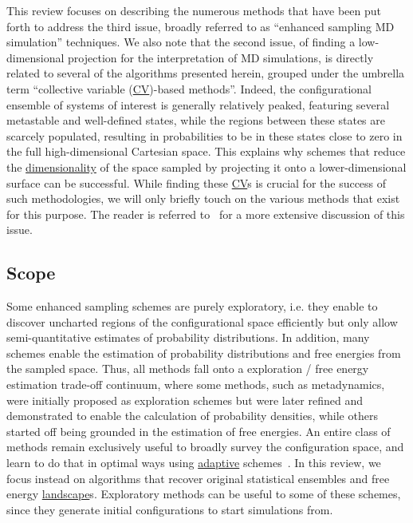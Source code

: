 \documentclass[9pt,review]{livecoms}
\begin{document}
This review focuses on describing the numerous methods that have been put forth to address the third issue, broadly referred to as ``enhanced sampling MD simulation'' techniques. We also note that the second issue, of finding a low-dimensional projection for the interpretation of MD simulations, is directly related to several of the algorithms presented herein, grouped under the umbrella term ``collective variable (\hyperlink{ref:CV} {CV})-based methods''. Indeed, the configurational ensemble of systems of interest is generally relatively peaked, featuring several metastable and well-defined states, while the regions between these states are scarcely populated, resulting in probabilities to be in these states close to zero in the full high-dimensional Cartesian space. This explains why schemes that reduce the \hyperlink{ref:DimRed} {dimensionality} of the space sampled by projecting it onto a lower-dimensional surface can be successful. While finding these \hyperlink{ref:CV} {CV}s is crucial for the success of such methodologies, we will only briefly touch on the various methods that exist for this purpose. The reader is referred to~\cite{WANG2020139, doi:10.1080/00268976.2020.1737742, doi:10.1021/acs.jctc.0c00355} for a more extensive discussion of this issue.



\subsection{Scope}

Some enhanced sampling schemes are purely exploratory, i.e. they enable to discover uncharted regions of the configurational space efficiently but only allow semi-quantitative estimates of probability distributions. In addition, many schemes enable the estimation of probability distributions and free energies from the sampled space. Thus, all methods fall onto a exploration / free energy estimation trade-off continuum, where some methods, such as metadynamics, were initially proposed as exploration schemes but were later refined and demonstrated to enable the calculation of probability densities, while others started off being grounded in the estimation of free energies. An entire class of methods remain exclusively useful to broadly survey the configuration space, and learn to do that in optimal ways using \hyperlink{ref:Adaptive} {adaptive} schemes~\cite{ChiavazzoE5494}. In this review, we focus instead on algorithms that recover original statistical ensembles and free energy \hyperlink{ref:FES} {landscape}s. Exploratory methods can be useful to some of these schemes, since they generate initial configurations to start simulations from.
\end{document}
